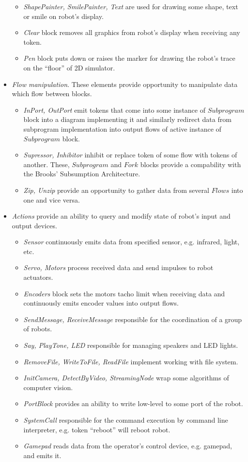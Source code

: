 \documentclass[conference,compsoc]{IEEEtran}
\begin{document}
\begin{itemize}
\begin{itemize}
\item \textit{ShapePainter, SmilePainter, Text} are used for drawing some shape, text or smile on robot's display. 
\item \textit{Clear} block removes all graphics from robot's display when receiving any token.
\item \textit{Pen} block puts down or raises the marker for drawing the robot's trace on the ``floor'' of 2D simulator.
\end{itemize} 
\item \textit{Flow manipulation}. These elements provide opportunity to manipulate data which flow between blocks.
\begin{itemize}
\item \textit{InPort, OutPort} emit tokens that come into some instance of $Subprogram$ block into a diagram implementing it and similarly redirect data from subprogram implementation into output flows of active instance of $Subprogram$ block.
\item \textit{Supressor, Inhibitor} inhibit or replace token of some flow with tokens of another. These, $Subprogram$ and $Fork$ blocks provide a compability with the Brooks' Subsumption Architecture.
\item \textit{Zip, Unzip} provide an opportunity to gather data from several $Flows$ into one and vice versa.
\end{itemize} 
\item \textit{Actions} provide an ability to query and modify state of robot's input and output devices.
\begin{itemize}
\item \textit{Sensor} continuously emits data from specified sensor, e.g. infrared, light, etc.
\item \textit{Servo, Motors} process received data and send impulses to robot actuators.
\item \textit{Encoders} block sets the motors tacho limit when receiving data and continuously emits encoder values into output flows.
\item \textit{SendMessage, ReceiveMessage} responsible for the coordination of a group of robots.
\item \textit{Say, PlayTone, LED} responsible for managing speakers and LED lights.
\item \textit{RemoveFile, WriteToFile, ReadFile} implement working with file system.
\item \textit{InitCamera, DetectByVideo, StreamingNode} wrap some algorithms of computer vision.
\item \textit{PortBlock} provides an ability to write low-level to some port of the robot.
\item \textit{SystemCall} responsible for the command execution by command line interpreter, e.g. token ``reboot'' will reboot robot.
\item \textit{Gamepad} reads data from the operator's control device, e.g. gamepad, and emits it.
\end{itemize} 
\end{itemize} 
\end{document}
